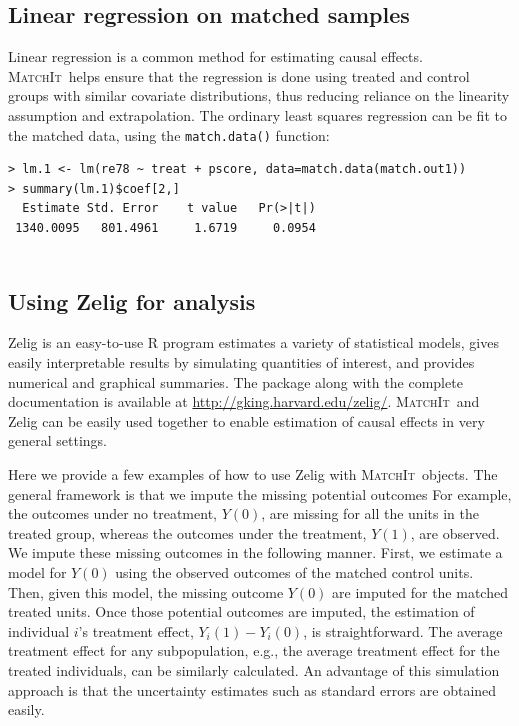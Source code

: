 \documentclass[oneside,letterpaper,titlepage]{article}
\newcommand{\MatchIt}{\textsc{MatchIt}}
\begin{document}
\subsection{Linear regression on matched samples}
Linear regression is a common method for estimating causal effects.
\MatchIt\ helps ensure that the regression is done using treated and
control groups with similar covariate distributions, thus reducing
reliance on the linearity assumption and extrapolation.  The ordinary
least squares regression can be fit to the matched data, using the
{\tt match.data()} function:

\begin{verbatim}
> lm.1 <- lm(re78 ~ treat + pscore, data=match.data(match.out1))                                                                                               
> summary(lm.1)$coef[2,]
  Estimate Std. Error    t value   Pr(>|t|)
 1340.0095   801.4961     1.6719     0.0954


\end{verbatim}

\subsection{Using Zelig for analysis}
Zelig is an easy-to-use R program estimates a variety of statistical
models, gives easily interpretable results by simulating quantities of
interest, and provides numerical and graphical summaries.  The package
along with the complete documentation is available at
\href{http://gking.harvard.edu/zelig/}{http://gking.harvard.edu/zelig/}.
\MatchIt\ and Zelig can be easily used together to enable estimation
of causal effects in very general settings.
                                                                                                                                                             
Here we provide a few examples of how to use Zelig with \MatchIt\ 
objects.  The general framework is that we impute the missing
potential outcomes For example, the outcomes under no treatment,
$Y(0)$, are missing for all the units in the treated group, whereas
the outcomes under the treatment, $Y(1)$, are observed.  We impute
these missing outcomes in the following manner. First, we estimate a
model for $Y(0)$ using the observed outcomes of the matched control
units. Then, given this model, the missing outcome $Y(0)$ are imputed
for the matched treated units. Once those potential outcomes are
imputed, the estimation of individual $i$'s treatment effect,
$Y_i(1)-Y_i(0)$, is straightforward. The average treatment effect for
any subpopulation, e.g., the average treatment effect for the treated
individuals, can be similarly calculated. An advantage of this
simulation approach is that the uncertainty estimates such as standard
errors are obtained easily.
\end{document}
